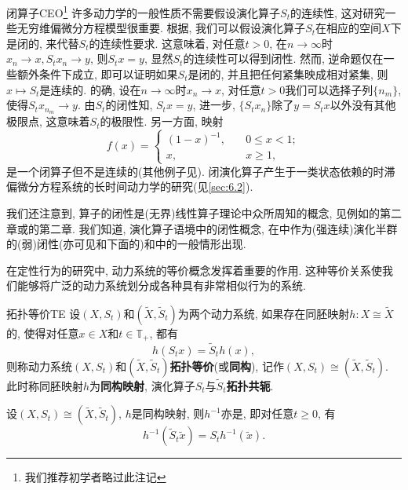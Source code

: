 \begin{remark}{闭算子}{CEO}\footnote{我们推荐初学者略过此注记}
	许多动力学的一般性质不需要假设演化算子$S_{t}$的连续性, 这对研究一些无穷维偏微分方程模型很重要. 根据\cite{Pata07}, 我们可以假设演化算子$S_{t}$在相应的空间$X$下是闭的, 来代替$S_{t}$的连续性要求. 这意味着, 对任意$t>0$, 在$n\to\infty$时$x_{n}\to x, S_{t}x_{n}\to y$, 则$S_{t}x=y$, 显然$S_{t}$的连续性可以得到闭性. 然而, 逆命题仅在一些额外条件下成立, 即可以证明如果$S_{t}$是闭的, 并且把任何紧集映成相对紧集, 则$x\mapsto S_{t}$是连续的. 的确, 设在$n\to\infty$时$x_{n}\to x$, 对任意$t>0$我们可以选择子列$\{n_{m}\}$, 使得$S_{t}x_{n_{m}}\to y$. 由$S_{t}$的闭性知, $S_{t}x=y$, 进一步, $\{S_{t}x_{n}\}$除了$y=S_{t}x$以外没有其他极限点, 这意味着$S_{t}$的极限性. 另一方面, 映射$$f(x)=\begin{cases}(1-x)^{-1},&\quad 0\leqslant x<1;\\x,&\quad x\geqslant 1,\end{cases}$$是一个闭算子但不是连续的(其他例子见\cite{Pata07}). 闭演化算子产生于一类状态依赖的时滞偏微分方程系统的长时间动力学的研究(见\ref{sec:6.2}).
	
	我们还注意到, 算子的闭性是(无界)线性算子理论中众所周知的概念, 见例如\cite{Dunford58}的第二章或\cite{Yosida74}的第二章. 我们知道, 演化算子语境中的闭性概念, 在\cite{Babin92}中作为(强连续)演化半群的(弱)闭性(亦可见\cite{Chueshov99}和下面的)和\cite{Pata07}中的一般情形出现. 
\end{remark}

在定性行为的研究中, 动力系统的等价概念发挥着重要的作用. 这种等价关系使我们能够将广泛的动力系统划分成各种具有非常相似行为的系统. 

\begin{definition}{拓扑等价}{TE}
	设$(X,S_{t})$和$(\tilde{X},\tilde{S}_{t})$为两个动力系统, 如果存在同胚映射$h: X\cong\tilde{X}$的, 使得对任意$x\in X$和$t\in\mathbb{T}_{+}$, 都有$$
	h(S_{t}x)=\tilde{S}_{t}h(x),$$则称动力系统$(X,S_{t})$和$(\tilde{X},\tilde{S}_{t})$\textbf{拓扑等价}(或\textbf{同构}), 记作$(X,S_{t})\cong (\tilde{X},\tilde{S}_{t})$.  此时称同胚映射$h$为\textbf{同构映射}, 演化算子$S_{t}$与$\tilde{S}_{t}$\textbf{拓扑共轭}.  
\end{definition}

\begin{exercise}\label{exe:ISO}
	设$(X,S_{t})\cong(\tilde{X},\tilde{S}_{t})$, $h$是同构映射, 则$h^{-1}$亦是, 即对任意$t\geqslant 0$, 有$$h^{-1}(\tilde{S}_{t}\tilde{x})=S_{t}h^{-1}(\tilde{x}).$$
\end{exercise}

